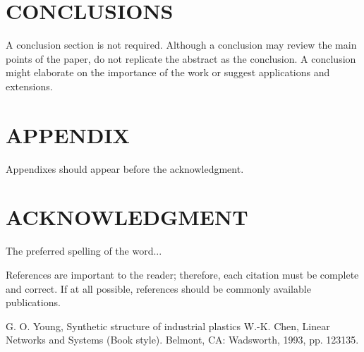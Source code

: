 \documentclass[letterpaper, 10 pt, conference]{ieeeconf}  %
\begin{document}
\section{CONCLUSIONS}

A conclusion section is not required. Although a conclusion may review the main points of the paper, do not replicate the abstract as the conclusion. A conclusion might elaborate on the importance of the work or suggest applications and extensions. 

\addtolength{\textheight}{-12cm}   %







\section*{APPENDIX}

Appendixes should appear before the acknowledgment.

\section*{ACKNOWLEDGMENT}

The preferred spelling of the word...




References are important to the reader; therefore, each citation must be complete and correct. If at all possible, references should be commonly available publications.



\begin{thebibliography}{99}

 G. O. Young, Synthetic structure of industrial plastics
 W.-K. Chen, Linear Networks and Systems (Book style).	Belmont, CA: Wadsworth, 1993, pp. 123135.


\end{thebibliography}
\end{document}
